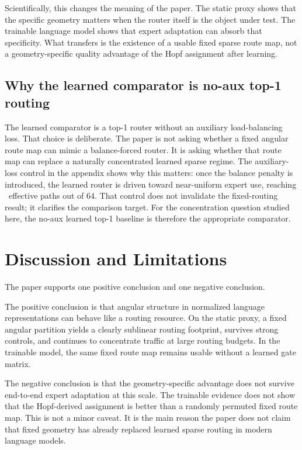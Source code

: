 \documentclass[10pt,letterpaper]{article}
\begin{document}
Scientifically, this changes the meaning of the paper. The static proxy shows that the specific geometry matters when the router itself is the object under test. The trainable language model shows that expert adaptation can absorb that specificity. What transfers is the existence of a usable fixed sparse route map, not a geometry-specific quality advantage of the Hopf assignment after learning.

\subsection{Why the learned comparator is no-aux top-1 routing}
The learned comparator is a top-1 router without an auxiliary load-balancing loss. That choice is deliberate. The paper is not asking whether a fixed angular route map can mimic a balance-forced router. It is asking whether that route map can replace a naturally concentrated learned sparse regime. The auxiliary-loss control in the appendix shows why this matters: once the balance penalty is introduced, the learned router is driven toward near-uniform expert use, reaching \PaperAuxSparseEff\ effective paths out of 64. That control does not invalidate the fixed-routing result; it clarifies the comparison target. For the concentration question studied here, the no-aux learned top-1 baseline is therefore the appropriate comparator.

\section{Discussion and Limitations}
The paper supports one positive conclusion and one negative conclusion.

The positive conclusion is that angular structure in normalized language representations can behave like a routing resource. On the static proxy, a fixed angular partition yields a clearly sublinear routing footprint, survives strong controls, and continues to concentrate traffic at large routing budgets. In the trainable model, the same fixed route map remains usable without a learned gate matrix.

The negative conclusion is that the geometry-specific advantage does not survive end-to-end expert adaptation at this scale. The trainable evidence does not show that the Hopf-derived assignment is better than a randomly permuted fixed route map. This is not a minor caveat. It is the main reason the paper does not claim that fixed geometry has already replaced learned sparse routing in modern language models.
\end{document}
